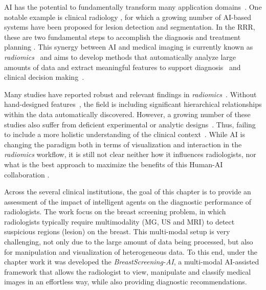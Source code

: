 \ac{AI} has the potential to fundamentally transform many application domains~\cite{ghahramani2015probabilistic}.
One notable example is clinical radiology \cite{choy2018current, hosny2018artificial}, for which a growing number of \ac{AI}-based systems have been proposed for lesion detection and segmentation.
In the \ac{RRR}, these are two fundamental steps to accomplish the diagnosis and treatment planning \cite{kooi2017large, graffy2019automated, lakhani2017deep, liang2019deep}.
This synergy between \ac{AI} and medical imaging is currently known as {\it radiomics}~\cite{Lambin2017} and aims to develop methods that automatically analyze large amounts of data and extract meaningful features to support diagnosis~\cite{Ruddle:2016:DEI:2872314.2834117} and clinical decision making~\cite{Park:2015:TOA:2737795.2656213}.

Many studies have reported robust and relevant findings in {\it radiomics}~\cite{aerts2017data}.
Without hand-designed features~\cite{ker2018deep}, the field is including significant hierarchical relationships within the data automatically discovered.
However, a growing number of these studies also suffer from deficient experimental or analytic designs~\cite{aerts2017data}.
Thus, failing to include a more holistic understanding of the clinical context~\cite{Sultanum:2018:MTP:3173574.3173996}.
While \ac{AI} is changing the paradigm both in terms of visualization and interaction in the {\it radiomics} workflow, it is still not clear neither how it influences radiologists, nor what is the best approach to maximize the benefits of this Human-\ac{AI} collaboration \cite{Kocielnik:2019:YAI:3290605.3300641}.

Across the several clinical institutions\footnotemark[20], the goal of this chapter is to provide an assessment of the impact of intelligent agents on the diagnostic performance of radiologists.
The work focus on the breast screening problem, in which radiologists typically require multimodality (\ac{MG}, \ac{US} and \ac{MRI}) to detect suspicious regions (lesion) on the breast.
This multi-modal setup is very challenging, not only due to the large amount of data being processed, but also for manipulation and visualization of heterogeneous data.
To this end, under the chapter work it was developed the {\it BreastScreening-AI}, a multi-modal \ac{AI}-assisted framework  that allows the radiologist to view, manipulate and classify medical images in an effortless way, while also providing diagnostic recommendations.

